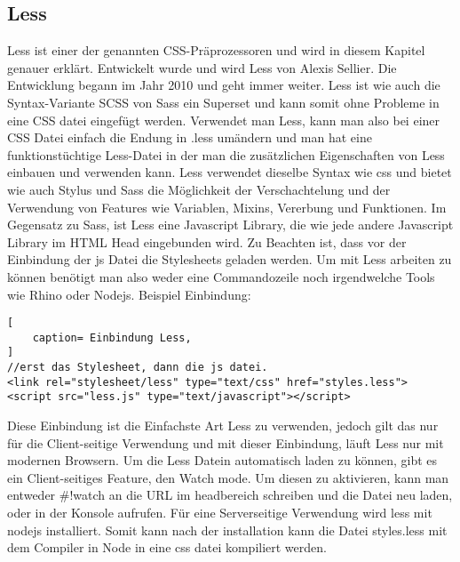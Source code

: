 \subsection{Less}
Less ist einer der genannten CSS-Präprozessoren und wird in diesem Kapitel genauer erklärt.\newline
Entwickelt wurde und wird Less von Alexis Sellier. Die Entwicklung begann im Jahr 2010 und geht immer weiter.\newline
Less ist wie auch die Syntax-Variante SCSS von Sass ein Superset und kann somit ohne Probleme in eine CSS datei eingefügt werden. Verwendet man Less, kann man also bei einer CSS Datei einfach die Endung in .less umändern und man hat eine funktionstüchtige Less-Datei in der man die zusätzlichen Eigenschaften von Less einbauen und verwenden kann. \newline
Less verwendet dieselbe Syntax wie css und bietet wie auch Stylus und Sass die Möglichkeit der Verschachtelung und der Verwendung von Features wie Variablen, Mixins, Vererbung und Funktionen.\newline
Im Gegensatz zu Sass, ist Less eine Javascript Library, die wie jede andere Javascript Library im HTML Head eingebunden wird. Zu Beachten ist, dass vor der Einbindung der js Datei die Stylesheets geladen werden. \newline
Um mit Less arbeiten zu können benötigt man also weder eine Commandozeile noch irgendwelche Tools wie Rhino oder Nodejs.
Beispiel Einbindung:
\begin{lstlisting}[
	caption= Einbindung Less,
]
//erst das Stylesheet, dann die js datei.
<link rel="stylesheet/less" type="text/css" href="styles.less">
<script src="less.js" type="text/javascript"></script>    
\end{lstlisting}
Diese Einbindung ist die Einfachste Art Less zu verwenden, jedoch gilt das nur für die Client-seitige Verwendung und mit dieser Einbindung, läuft Less nur mit modernen Browsern.\newline
Um die Less Datein automatisch laden zu können, gibt es ein Client-seitiges Feature, den Watch mode. Um diesen zu aktivieren, kann man entweder \grqq\#!watch\glqq{} an die URL im headbereich schreiben und die Datei neu laden, oder in der Konsole \glqq{}   aufrufen.\newline
Für eine Serverseitige Verwendung wird less mit nodejs installiert. Somit kann nach der installation kann die Datei styles.less mit dem Compiler in Node in eine css datei kompiliert werden.\autocite[]{Sellier.2013}

